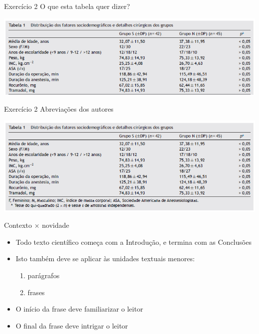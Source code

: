 \documentclass{beamer}
\begin{document}
\begin{frame}{Exercício 2}
  O que esta tabela quer dizer?
  \begin{center}
    \includegraphics[width=1.18\textwidth]{Escrita/exercicio-tabela-1}
  \end{center}
\end{frame}

\begin{frame}{Exercício 2}
  Abreviações dos autores
  \begin{center}
    \includegraphics[width=1.18\textwidth]{Escrita/exercicio-tabela-2}
  \end{center}
\end{frame}

\begin{frame}{Contexto $\times$ novidade}
  \begin{itemize}
    \footnotesize
  \item Todo texto científico começa com a Introdução, e termina com
    as Conclusões
    \medskip
  \item Isto também deve se aplicar às unidades textuais menores:
    \begin{enumerate}
      \scriptsize
    \item parágrafos
    \item frases
    \end{enumerate}
    \medskip
  \item<2-> O início da frase deve familiarizar o leitor
    \medskip
  \item<3-> O final da frase deve intrigar o leitor
  \end{itemize}
\end{frame}
\end{document}
